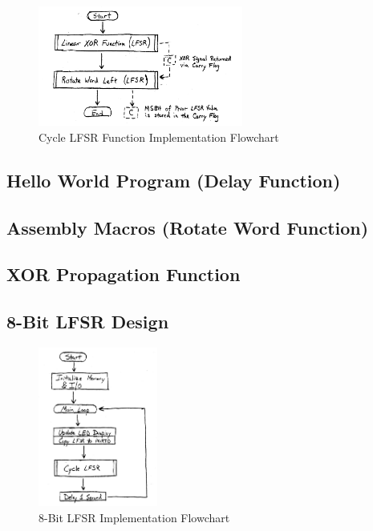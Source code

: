 \documentclass[11pt]{article}
\begin{document}
\begin{figure}
	\centering
	\includegraphics[width=0.6\textwidth]{Figures/cycle-lfsr-flowchart.pdf}
	\caption{Cycle LFSR Function Implementation Flowchart}
	\label{cycle-lfsr-flowchart}
\end{figure}


\subsection{Hello World Program (Delay Function)}

\subsection{Assembly Macros (Rotate Word Function)}

\subsection{XOR Propagation Function}

\subsection{8-Bit LFSR Design}

\begin{figure}
	\centering
	\includegraphics[width=0.35\textwidth]{Figures/8-bit-lfsr-flowchart.pdf}
	\caption{8-Bit LFSR Implementation Flowchart}
	\label{8-bit-lfsr-flowchart}
\end{figure}
\end{document}
